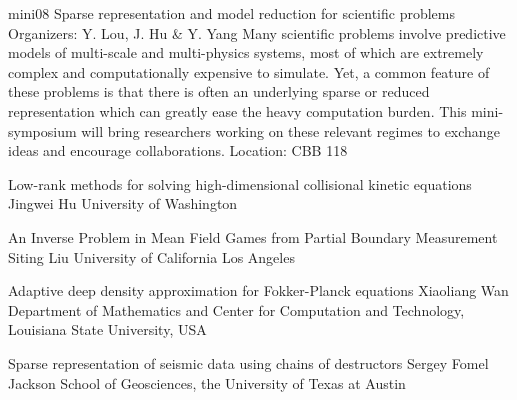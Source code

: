 \mini
{mini08}
{Sparse representation and model reduction for scientific problems}
{Organizers: Y. Lou, J. Hu \& Y. Yang}
{Many scientific problems involve predictive models of multi-scale and multi-physics systems, most of which are extremely complex and computationally expensive to simulate. Yet, a common feature of these problems is that there is often an underlying sparse or reduced representation which can greatly ease the heavy computation burden. This mini-symposium will bring researchers working on these relevant regimes to exchange ideas and encourage collaborations.}
{Location: CBB 118}

\begin{talks}
\item\talk
{Low-rank methods for solving high-dimensional collisional kinetic equations}
{Jingwei Hu}
{University of Washington}
\item\talk
{An Inverse Problem in Mean Field Games from Partial Boundary Measurement}
{Siting Liu}
{University of California Los Angeles}
\item\talk
{Adaptive deep density approximation for Fokker-Planck equations}
{Xiaoliang Wan}
{Department of Mathematics and Center for Computation and Technology, Louisiana State University, USA}
\item\talk
{Sparse representation of seismic data using chains of destructors}
{Sergey Fomel}
{Jackson School of Geosciences, the University of Texas at Austin}
\end{talks}
\room
